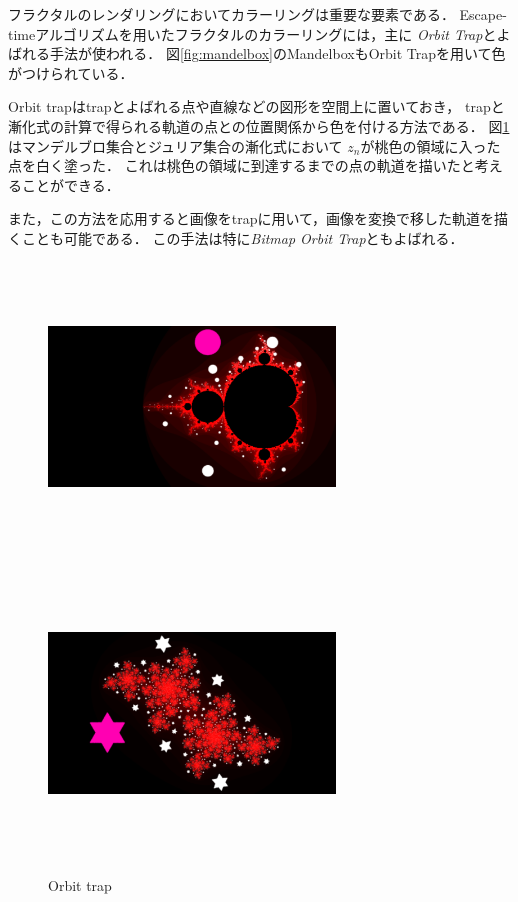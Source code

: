フラクタルのレンダリングにおいてカラーリングは重要な要素である．
Escape-timeアルゴリズムを用いたフラクタルのカラーリングには，主に\textit{
Orbit Trap}とよばれる手法が使われる．
図\ref{fig:mandelbox}のMandelboxもOrbit Trapを用いて色がつけられている．

Orbit trapはtrapとよばれる点や直線などの図形を空間上に置いておき，
trapと漸化式の計算で得られる軌道の点との位置関係から色を付ける方法である．
図\ref{fig:orbitTrap}はマンデルブロ集合とジュリア集合の漸化式において
$z_n$が桃色の領域に入った点を白く塗った．
これは桃色の領域に到達するまでの点の軌道を描いたと考えることができる．

また，この方法を応用すると画像をtrapに用いて，画像を変換で移した軌道を描
くことも可能である．
この手法は特に\textit{Bitmap Orbit Trap}ともよばれる．

\begin{figure}[htbp]
 \begin{minipage}{0.49\hsize}
  \center
  \includegraphics[width=3in, height=3in, keepaspectratio]{../img/fractal/mandelbrot-orbit.pdf}
  \label{}
 \end{minipage}
 \begin{minipage}{0.49\hsize}
  \center
  \includegraphics[width=3in, height=3in,
   keepaspectratio]{../img/fractal/juliaOrbit.pdf}
  \label{}
 \end{minipage}
 \caption{Orbit trap}
 \label{fig:orbitTrap}
\end{figure}

